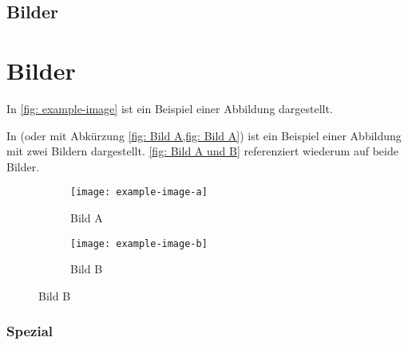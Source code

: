 \documentclass[./\jobname.tex]{subfiles}
\begin{document}
	\section{Bilder}
\else
	\chapter{Bilder}
\fi
%
In \autoref{fig: example-image} ist ein Beispiel einer Abbildung dargestellt.
%
\begin{figure}[H]
\centering
\noindent{}
	\label{fig: example-image}
\end{figure}
%
In  (oder mit Abkürzung \cref{fig: Bild A,fig: Bild A}) ist ein Beispiel einer Abbildung mit zwei Bildern dargestellt. \autoref{fig: Bild A und B} referenziert wiederum auf beide Bilder.
%
\begin{figure}[H]
	\centering
	\begin{subfigure}[b]{0.5\linewidth}
		\centering
		\texttt{[image: example-image-a]}
		\caption{Bild A}
		\label{fig: Bild A}
	\end{subfigure}%
	\begin{subfigure}[b]{0.5\linewidth}
		\centering
		\texttt{[image: example-image-b]}
		\caption{Bild B}
		\label{fig: Bild B}
	\end{subfigure}%
	\label{fig: Bild A und B}
\end{figure}
%
\if\paper\FHVmode
	\subsection{Spezial}
\else
\end{document}
